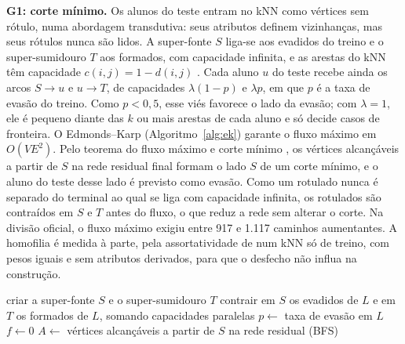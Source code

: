 \textbf{G1: corte mínimo.} Os alunos do teste entram no kNN como vértices sem rótulo, numa abordagem transdutiva: seus atributos definem vizinhanças, mas seus rótulos nunca são lidos. A super-fonte $S$ liga-se aos evadidos do treino e o super-sumidouro $T$ aos formados, com capacidade infinita, e as arestas do kNN têm capacidade $c(i,j)=1-d(i,j)$ \citep{blum2001}. Cada aluno $u$ do teste recebe ainda os arcos $S\to u$ e $u\to T$, de capacidades $\lambda(1-p)$ e $\lambda p$, em que $p$ é a taxa de evasão do treino. Como $p<0{,}5$, esse viés favorece o lado da evasão; com $\lambda=1$, ele é pequeno diante das $k$ ou mais arestas de cada aluno e só decide casos de fronteira. O Edmonds--Karp (Algoritmo~\ref{alg:ek}) garante o fluxo máximo em $O(VE^2)$. Pelo teorema do fluxo máximo e corte mínimo \citep{cormen2009}, os vértices alcançáveis a partir de $S$ na rede residual final formam o lado $S$ de um corte mínimo, e o aluno do teste desse lado é previsto como evasão. Como um rotulado nunca é separado do terminal ao qual se liga com capacidade infinita, os rotulados são contraídos em $S$ e $T$ antes do fluxo, o que reduz a rede sem alterar o corte. Na divisão oficial, o fluxo máximo exigiu entre 917 e 1.117 caminhos aumentantes. A homofilia é medida à parte, pela assortatividade de \citet{newman2003} num kNN só de treino, com pesos iguais e sem atributos derivados, para que o desfecho não influa na construção.

\begin{algorithm}[ht!]
\small
\algportugues
{}
criar a super-fonte $S$ e o super-sumidouro $T$\;
contrair em $S$ os evadidos de $L$ e em $T$ os formados de $L$, somando capacidades paralelas 
$p \leftarrow$ taxa de evasão em $L$\;
$f \leftarrow 0$\;
$A \leftarrow$ vértices alcançáveis a partir de $S$ na rede residual (BFS)\;
\;
\caption{Classificação por corte mínimo (Edmonds--Karp)}
\label{alg:ek}
\end{algorithm}

